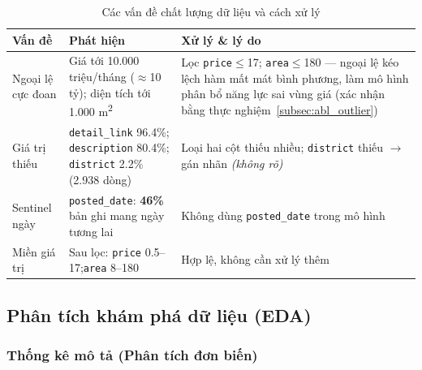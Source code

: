 \begin{table}[H]
  \centering
  \caption{Các vấn đề chất lượng dữ liệu và cách xử lý}
  \label{tab:quality}
  \begin{tabularx}{\textwidth}{@{}L{3.0cm} L{5.2cm} X@{}}
    \toprule
    \textbf{Vấn đề} & \textbf{Phát hiện} & \textbf{Xử lý \& lý do} \\
    \midrule
    Ngoại lệ cực đoan &
      Giá tới 10.000 triệu/tháng ($\approx$10 tỷ); diện tích tới 1.000 m\textsuperscript{2} &
      Lọc \texttt{price}$\leq$17; \texttt{area}$\leq$180 — ngoại lệ kéo lệch
      hàm mất mát bình phương, làm mô hình phân bổ năng lực sai vùng giá
      (xác nhận bằng thực nghiệm~\ref{subsec:abl_outlier}) \\
    \addlinespace
    Giá trị thiếu &
      \texttt{detail\_link} 96.4\%;\newline
      \texttt{description} 80.4\%;\newline
      \texttt{district} 2.2\% (2.938 dòng) &
      Loại hai cột thiếu nhiều;\newline
      \texttt{district} thiếu $\to$ gán nhãn \textit{(không rõ)} \\
    \addlinespace
    Sentinel ngày &
      \texttt{posted\_date}: \textbf{46\%} bản ghi mang ngày tương lai &
      Không dùng \texttt{posted\_date} trong mô hình \\
    \addlinespace
    Miền giá trị &
      Sau lọc: \texttt{price} 0.5--17;\quad \texttt{area} 8--180 &
      Hợp lệ, không cần xử lý thêm \\
    \bottomrule
  \end{tabularx}
\end{table}

\subsection{Phân tích khám phá dữ liệu (EDA)}
\label{subsec:eda}

\subsubsection*{Thống kê mô tả (Phân tích đơn biến)}

